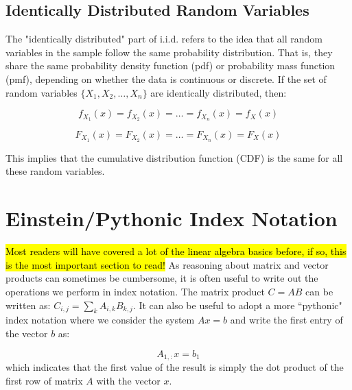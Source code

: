 \subsection{Identically Distributed Random Variables}

The "identically distributed" part of i.i.d. refers to the idea that all random variables in the sample follow the same probability distribution. That is, they share the same probability density function (pdf) or probability mass function (pmf), depending on whether the data is continuous or discrete. If the set of random variables \(\{X_1, X_2, \ldots, X_n\}\) are identically distributed, then:





\begin{equation}
    f_{X_1}(x) = f_{X_2}(x) = \ldots = f_{X_n}(x) = f_{X}(x)
\end{equation}

\begin{equation}
    F_{X_1}(x) = F_{X_2}(x) = \ldots = F_{X_n}(x) = F_{X}(x)
\end{equation}

\noindent This implies that the cumulative distribution function (CDF) is the same for all these random variables.


\section{Einstein/Pythonic Index Notation}
\hl{Most readers will have covered a lot of the linear algebra basics before, if so, this is the most important section to read!}
As reasoning about matrix and vector products can sometimes be cumbersome, it is often useful to write out the operations we perform in index notation. The matrix product $C = AB$ can be written as: $C_{i,j} = \sum_k A_{i,k}B_{k,j}$. It can also be useful to adopt a more ``pythonic" index notation where we consider the system $Ax = b$ and write the first entry of the vector $b$ as:


\begin{equation}
    A_{1,:}x = b_1
\end{equation}
which indicates that the first value of the result is simply the dot product of the first row of matrix $A$ with the vector $x$.

